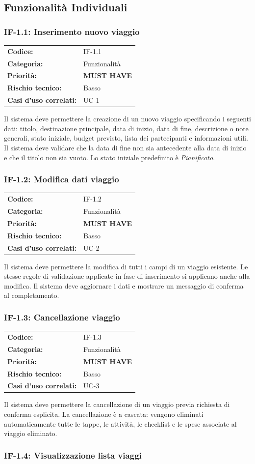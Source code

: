 \documentclass[12pt, a4paper]{article}
\makeatletter
\newcommand{\reqblock}[5]{%
  \begin{tabular}{@{}ll@{}}
    \toprule
    \textbf{Codice:}              & #1 \\
    \textbf{Categoria:}           & #2 \\
    \textbf{Priorità:}            & #3 \\
    \textbf{Rischio tecnico:}     & #4 \\
    \textbf{Casi d'uso correlati:}& #5 \\
    \bottomrule
  \end{tabular}
}
\newcommand{\MUST}{\colorbox{musthave}{\small\textbf{MUST HAVE}}}
\newcommand{\RISKL}{\colorbox{risklow}{\small Basso}}
\makeatother
\begin{document}
\subsection{Funzionalità Individuali}

\subsubsection{IF-1.1: Inserimento nuovo viaggio}

\medskip
\reqblock{IF-1.1}{Funzionalità}{\MUST}{\RISKL}{UC-1}
\medskip

\noindent
Il sistema deve permettere la creazione di un nuovo viaggio specificando i seguenti dati:
titolo, destinazione principale, data di inizio, data di fine, descrizione o note generali,
stato iniziale, budget previsto, lista dei partecipanti e informazioni utili. Il sistema
deve validare che la data di fine non sia antecedente alla data di inizio e che il titolo
non sia vuoto. Lo stato iniziale predefinito è \textit{Pianificato}.

\subsubsection{IF-1.2: Modifica dati viaggio}

\medskip
\reqblock{IF-1.2}{Funzionalità}{\MUST}{\RISKL}{UC-2}
\medskip

\noindent
Il sistema deve permettere la modifica di tutti i campi di un viaggio esistente. Le stesse
regole di validazione applicate in fase di inserimento si applicano anche alla modifica.
Il sistema deve aggiornare i dati e mostrare un messaggio di conferma al completamento.

\subsubsection{IF-1.3: Cancellazione viaggio}

\medskip
\reqblock{IF-1.3}{Funzionalità}{\MUST}{\RISKL}{UC-3}
\medskip

\noindent
Il sistema deve permettere la cancellazione di un viaggio previa richiesta di conferma
esplicita. La cancellazione è a cascata: vengono eliminati automaticamente tutte le tappe,
le attività, le checklist e le spese associate al viaggio eliminato.

\subsubsection{IF-1.4: Visualizzazione lista viaggi}
\end{document}
